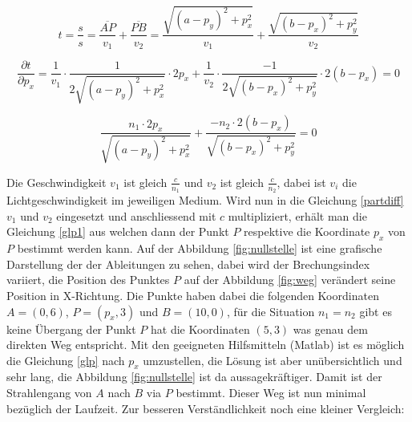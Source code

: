 \begin{refsection}
\begin{equation}\label{tbest}
t=\dfrac{s}{s}=\dfrac{\overline{AP}}{v_{1}}+\dfrac{\overline{PB}}{v_{2}}= 
\dfrac{\sqrt{(a-p_{y})^{2}+p_{x}^{2}}}{v_{1}}+ 
\dfrac{\sqrt{(b-p_{x})^{2}+p_{y}^{2}}}{v_{2}}
\end{equation}

\begin{equation}\label{partdiff}
\dfrac{\partial t}{\partial p_{x}}=
\dfrac{1}{v_{1}}\cdot \dfrac{1}{2 \sqrt{(a-p_{y})^{2}+p_{x}^{2}}}\cdot 2p_{x} +
\dfrac{1}{v_{2}}\cdot \dfrac{-1}{2 \sqrt{(b-p_{x})^{2}+p_{y}^{2}}}\cdot 2(b-p_{x})= 0
\end{equation}

\begin{equation}\label{glp}
\dfrac{n_{1}\cdot 2p_{x} }{\sqrt{(a-p_{y})^{2}+p_{x}^{2}}}+
\dfrac{-n_{2}\cdot 2(b-p_{x})}{\sqrt{(b-p_{x})^{2}+p_{y}^{2}}}= 0
\end{equation}

Die Geschwindigkeit $ v_{1}$ ist gleich $\frac{c}{n_{1}} $ und $ v_{2}$ ist gleich $\frac{c}{n_{2}}$, dabei ist $v_{i}$ die Lichtgeschwindigkeit im jeweiligen Medium. Wird nun in die Gleichung \eqref{partdiff} $ v_{1}$ und $ v_{2}$ eingesetzt und anschliessend mit $c$ multipliziert, erhält man die Gleichung \eqref{glp1} aus welchen dann der Punkt $P$ respektive die Koordinate $p_{x}$ von $P$ bestimmt werden kann.
Auf der Abbildung \ref{fig:nullstelle} ist eine grafische Darstellung der der Ableitungen zu sehen, dabei wird der Brechungsindex variiert, die Position des Punktes $P$ auf der Abbildung \ref{fig:weg} verändert seine Position in X-Richtung. Die  Punkte haben dabei die folgenden Koordinaten $A = (0,6)$, $P=(p_{x},3)$ und $B=(10,0)$, für die Situation $n_{1}=n_{2}$ gibt es keine Übergang der Punkt $P$ hat die Koordinaten $(5,3)$ was genau dem direkten Weg entspricht. Mit den geeigneten Hilfsmitteln (Matlab) ist es möglich die Gleichung \eqref{glp} nach $p_{x}$ umzustellen, die Lösung ist aber unübersichtlich und sehr lang, die Abbildung \ref{fig:nullstelle} ist da aussagekräftiger.
Damit ist der Strahlengang von $A$ nach $B$ via $P$ bestimmt. Dieser Weg ist nun minimal bezüglich der Laufzeit. \newline
Zur besseren Verständlichkeit noch eine kleiner Vergleich:


\end{refsection}
